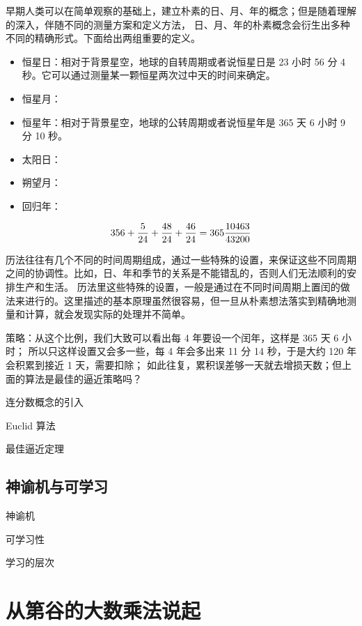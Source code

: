 \documentclass[a4paper,10.5pt]{book}
\begin{document}
早期人类可以在简单观察的基础上，建立朴素的日、月、年的概念；但是随着理解的深入，伴随不同的测量方案和定义方法，
日、月、年的朴素概念会衍生出多种不同的精确形式。下面给出两组重要的定义。

\begin{itemize}
\item 恒星日：相对于背景星空，地球的自转周期或者说恒星日是 23 小时 56 分 4 秒。它可以通过测量某一颗恒星两次过中天的时间来确定。
\item 恒星月：
\item 恒星年：相对于背景星空，地球的公转周期或者说恒星年是 365 天 6 小时 9 分 10 秒。
\end{itemize}

\begin{itemize}
\item 太阳日：
\item 朔望月：
\item 回归年：
\end{itemize}

$$
356 + \frac{5}{24} + \frac{48}{24 \time 60} + \frac{46}{24 \time 60 \time 60} = 365 \frac{10463}{43200}
$$

历法往往有几个不同的时间周期组成，通过一些特殊的设置，来保证这些不同周期之间的协调性。比如，日、年和季节的关系是不能错乱的，否则人们无法顺利的安排生产和生活。
历法里这些特殊的设置，一般是通过在不同时间周期上置闰的做法来进行的。这里描述的基本原理虽然很容易，但一旦从朴素想法落实到精确地测量和计算，就会发现实际的处理并不简单。

策略：从这个比例，我们大致可以看出每 4 年要设一个闰年，这样是 365 天 6 小时；
所以只这样设置又会多一些，每 4 年会多出来 11 分 14 秒，于是大约 120 年会积累到接近 1 天，需要扣除；
如此往复，累积误差够一天就去增损天数；但上面的算法是最佳的逼近策略吗？

连分数概念的引入

Euclid 算法

最佳逼近定理

\subsection{神谕机与可学习}

神谕机

可学习性

学习的层次

\section{从第谷的大数乘法说起}
\end{document}
